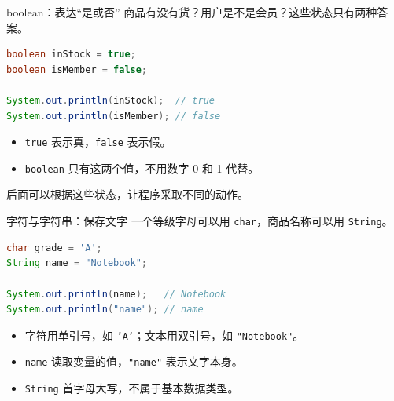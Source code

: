 \documentclass[aspectratio=169]{beamer}
\begin{document}
\begin{frame}[fragile]{boolean：表达“是或否”}
  商品有没有货？用户是不是会员？这些状态只有两种答案。
  \begin{lstlisting}[language=Java]
boolean inStock = true;
boolean isMember = false;

System.out.println(inStock);  // true
System.out.println(isMember); // false
  \end{lstlisting}
  \begin{itemize}
    \item \texttt{true} 表示真，\texttt{false} 表示假。
    \item \texttt{boolean} 只有这两个值，不用数字 0 和 1 代替。
  \end{itemize}
  \medskip
  后面可以根据这些状态，让程序采取不同的动作。
\end{frame}

\begin{frame}[fragile]{字符与字符串：保存文字}
  一个等级字母可以用 \texttt{char}，商品名称可以用 \texttt{String}。
  \begin{lstlisting}[language=Java]
char grade = 'A';
String name = "Notebook";

System.out.println(name);   // Notebook
System.out.println("name"); // name
  \end{lstlisting}
  \begin{itemize}
    \item 字符用单引号，如 \texttt{'A'}；文本用双引号，如 \texttt{"Notebook"}。
    \item \texttt{name} 读取变量的值，\texttt{"name"} 表示文字本身。
    \item \texttt{String} 首字母大写，不属于基本数据类型。
  \end{itemize}
\end{frame}

\end{document}

